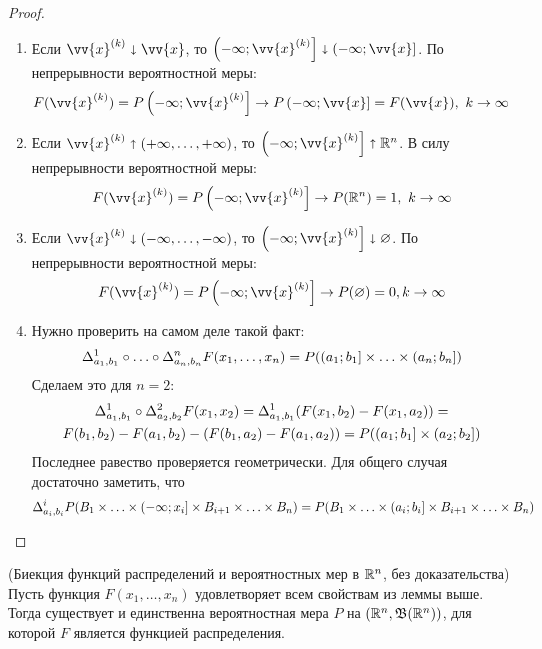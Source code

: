 \begin{proof}~
	\begin{enumerate}
		\item Если $\vv{x}^{(k)} \sda \vv{x}$, то $\rsi{-\infty; \vv{x}^{(k)}} \sda \rsi{-\infty; \vv{x}}$. По непрерывности вероятностной меры:
		\[
			F(\vv{x}^{(k)}) = P\rsi{-\infty; \vv{x}^{(k)}} \to P\rsi{-\infty; \vv{x}} = F(\vv{x}),\ k \to \infty
		\]
		
		\item Если $\vv{x}^{(k)} \sua (+\infty, \ldots, +\infty)$, то $\rsi{-\infty; \vv{x}^{(k)}} \sua \R^n$. В силу непрерывности вероятностной меры:
		\[
			F(\vv{x}^{(k)}) = P\rsi{-\infty; \vv{x}^{(k)}} \to P(\R^n) = 1,\ k \to \infty
		\]
		
		\item Если $\vv{x}^{(k)} \sda (-\infty, \ldots, -\infty)$, то $\rsi{-\infty; \vv{x}^{(k)}} \sda \emptyset$. По непрерывности вероятностной меры:
		\[
			F(\vv{x}^{(k)}) = P\rsi{-\infty; \vv{x}^{(k)}} \to P(\emptyset) = 0, k \to \infty
		\]
		
		\item Нужно проверить на самом деле такой факт:
		\[
			\Delta_{a_1, b_1}^1 \circ \ldots \circ \Delta_{a_n, b_n}^n F(x_1, \ldots, x_n) = P(\left(a_1; b_1\right] \times \ldots \times \left(a_n; b_n\right])
		\]
		Сделаем это для $n = 2$:
		\begin{multline*}
			\Delta_{a_1, b_1}^1 \circ \Delta_{a_2, b_2}^2 F(x_1, x_2) = \Delta_{a_1, b_1}^1 (F(x_1, b_2) - F(x_1, a_2)) =
			\\
			F(b_1, b_2) - F(a_1, b_2) - (F(b_1, a_2) - F(a_1, a_2)) = P(\left(a_1; b_1\right] \times \left(a_2; b_2\right])
		\end{multline*}
		Последнее равество проверяется геометрически. Для общего случая достаточно заметить, что
		\[
			\Delta_{a_i, b_i}^i P(B_1 \times \ldots \times \left(-\infty; x_i\right] \times B_{i + 1} \times \ldots \times B_n) = P(B_1 \times \ldots \times \left(a_i; b_i\right] \times B_{i + 1} \times \ldots \times B_n)
		\]
	\end{enumerate}
\end{proof}

\begin{theorem} (Биекция функций распределений и вероятностных мер в $\mathbb{R}^n$, без доказательства)
	Пусть функция $F(x_1, \ldots, x_n)$ удовлетворяет всем свойствам из леммы выше. Тогда существует и единственна вероятностная мера $P$ на $(\mathbb{R}^n, \mathfrak{B}(\mathbb{R}^n))$, для которой $F$ является функцией распределения.
\end{theorem}

